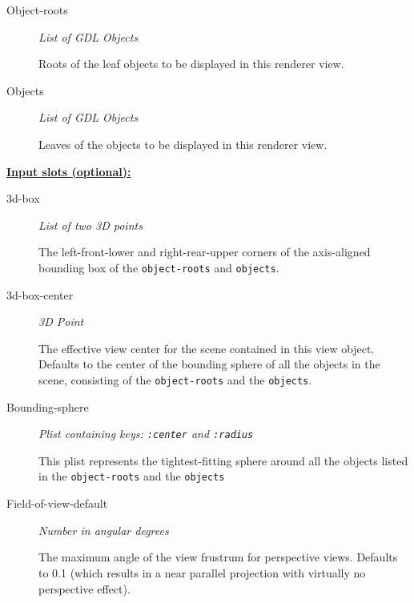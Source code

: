 \documentclass [11pt]{book}
\begin{document}
\begin{itemize}
\begin{description}

\item [Object-roots]
\emph{List of GDL Objects}

 Roots of the leaf objects to be displayed in this renderer view.




\item [Objects]
\emph{List of GDL Objects}

 Leaves of the objects to be displayed in this renderer view.




\end{description}






\textbf{
\underline{Input slots (optional):}}

\begin{description}

\item [3d-box]
\emph{List of two 3D points}

 The left-front-lower and right-rear-upper corners of the axis-aligned bounding
box of the \texttt{object-roots} and \texttt{objects}.




\item [3d-box-center]
\emph{3D Point}

 The effective view center for the scene contained in this view object. Defaults to the center of the bounding sphere of all
the objects in the scene, consisting of the \texttt{object-roots} and the \texttt{objects}.




\item [Bounding-sphere]
\emph{Plist containing keys: \texttt{:center} and \texttt{:radius}}

 This plist represents the tightest-fitting sphere
around all the objects listed in the \texttt{object-roots} and the \texttt{objects}




\item [Field-of-view-default]
\emph{Number in angular degrees}

 The maximum angle of the view frustrum for perspective views.
Defaults to 0.1 (which results in a near parallel projection with virtually no perspective effect).





\end{description}
\end{itemize}
\end{document}
